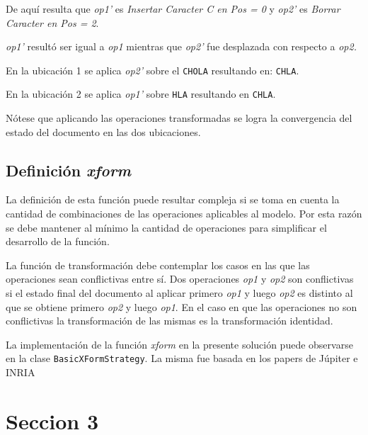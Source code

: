 \documentclass[12pt,a4paper]{article}
\begin{document}
	De aquí resulta que \textit{op1’} es \textit{Insertar Caracter C en Pos = 0} y \textit{op2’} es 
	\textit{Borrar Caracter en Pos = 2}.

\textit{op1’} resultó ser igual a \textit{op1} mientras que \textit{op2’} fue desplazada con respecto a 
\textit{op2.}

En la ubicación 1 se aplica \textit{op2’} sobre el \texttt{CHOLA} resultando en: \texttt{CHLA}.

En la ubicación 2 se aplica \textit{op1’} sobre \texttt{HLA} resultando en \texttt{CHLA}.

Nótese que aplicando las operaciones transformadas se logra la convergencia del estado del documento 
en las dos ubicaciones.

\subsection{Definición \textit{xform}}

La definición de esta función puede resultar compleja si se toma en cuenta la cantidad de 
combinaciones de las operaciones aplicables al modelo. Por esta razón se debe mantener al mínimo la 
cantidad de operaciones para simplificar el desarrollo de la función.

La función de transformación debe contemplar los casos en las que las operaciones sean conflictivas entre 
sí. Dos operaciones \textit{op1} y \textit{op2} son conflictivas si el estado final del documento al aplicar 
primero \textit{op1} y luego \textit{op2} es distinto al que se obtiene primero \textit{op2} y luego \textit{op1}.
En el caso en que las operaciones no son conflictivas la transformación de las mismas es la transformación 
identidad.

La implementación de la función \textit{xform} en la presente solución puede observarse en la clase 
\texttt{BasicXFormStrategy}. La misma fue basada en los papers de Júpiter e INRIA %

	\section{Seccion 3}
\end{document}
